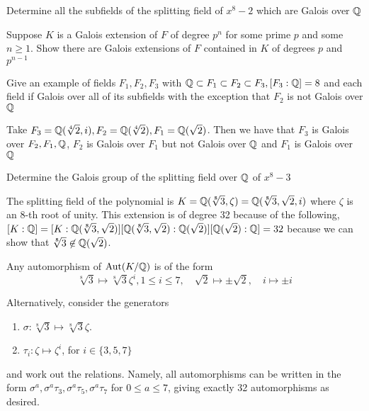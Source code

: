 \begin{unfinished}
    Determine all the subfields of the splitting field of $x^8 - 2$ which are Galois over $\mathbb{Q}$
\end{unfinished}

\begin{unfinished}
    Suppose $K$ is a Galois extension of $F$ of degree $p^n$ for some prime $p$ and some $n\geq 1$. Show there are Galois extensions of $F$ contained in $K$ of degrees $p$ and $p^{n-1}$
\end{unfinished}

\begin{exercise}    
    Give an example of fields $F_1, F_2, F_3$ with $\mathbb{Q} \subset F_1 \subset F_2 \subset F_3, [F_3:\mathbb{Q}] = 8$ and each field if Galois over all of its subfields with the exception that $F_2$ is not Galois over $\mathbb{Q}$
\end{exercise}
\begin{solution}
    Take $F_3 = \mathbb{Q}(\sqrt[4]{2}, i), F_2 = \mathbb{Q}(\sqrt[4]{2}), F_1 = \mathbb{Q}(\sqrt{2})$. Then we have that $F_3$ is Galois over $F_2, F_1, \mathbb{Q}$, $F_2$ is Galois over $F_1$ but not Galois over $\mathbb{Q}$ and $F_1$ is Galois over $\mathbb{Q}$
\end{solution}

\begin{exercise}
    Determine the Galois group of the splitting field over $\mathbb{Q}$ of $x^8 - 3$
\end{exercise}
\begin{solution}
    The splitting field of the polynomial is $K = \mathbb{Q}(\sqrt[8]{3}, \zeta) = \mathbb{Q}(\sqrt[8]{3}, \sqrt{2}, i)$ where $\zeta$ is an 8-th root of unity. This extension is of degree 32 because of the following, $[K:\mathbb{Q}]=[K:\mathbb{Q}(\sqrt[8]{3}, \sqrt{2})][\mathbb{Q}(\sqrt[8]{3}, \sqrt{2}):\mathbb{Q}(\sqrt{2})][\mathbb{Q}(\sqrt{2}):\mathbb{Q}] = 32$ because we can show that $\sqrt[8]{3} \not\in \mathbb{Q}(\sqrt{2})$.

    \noindent Any automorphism of $\operatorname{Aut}(K/\mathbb{Q})$ is of the form \[\sqrt[8]{3} \mapsto \sqrt[8]{3}\zeta^i, 1\leq i \leq 7,\quad \sqrt{2} \mapsto \pm\sqrt{2},\quad i \mapsto \pm i\]%

    Alternatively, consider the generators
    \begin{enumerate}
        \item $\sigma:\sqrt[8]{3}\mapsto\sqrt[8]{3}\zeta$.
        \item $\tau_{i}:\zeta\mapsto\zeta^{i}$, for $i\in\{3,5,7\}$
    \end{enumerate}
    and work out the relations. Namely, all automorphisms can be written in the form $\sigma^{a},\sigma^{a}\tau_{3},\sigma^{a}\tau_{5},\sigma^{a}\tau_{7}$ for $0\leq a\leq 7$, giving exactly 32 automorphisms as desired.
\end{solution}

